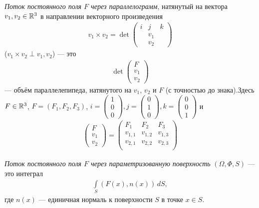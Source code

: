 \begin{df}
	\textit{Поток постоянного поля $F$ через параллелограмм}, натянутый на вектора $v_1, v_2 \in \mathbb{R}^{3}$ в направлении векторного произведения
 \begin{align*}
  v_1 \times v_2 = \det \begin{pmatrix}
   i & j & k \\
    & v_1 &  \\
    & v_2 &  
  \end{pmatrix}
 \end{align*} ($v_1 \times v_2 \perp v_1, v_2$) --- это
 \begin{align*}
  \det \begin{pmatrix}
   F \\
   v_1 \\
    v_2
  \end{pmatrix}
 \end{align*} --- объём параллелепипеда, натянутого на $v_1$, $v_2$ и $F$ (с точностью до знака).Здесь $F \in \mathbb{R}^{3}$, $F = (F_1, F_2, F_3)$, $i = \begin{pmatrix}
  1 \\ 0 \\ 0
 \end{pmatrix}, j = \begin{pmatrix}
  0 \\ 1 \\ 0
 \end{pmatrix}, k = \begin{pmatrix}
  0 \\ 0 \\ 1
 \end{pmatrix}$ и
 \begin{align*}
  \begin{pmatrix}
   F \\ v_1 \\ v_2
  \end{pmatrix} = \begin{pmatrix}
  F_1 & F_2 & F_3 \\
  v_{1,1} & v_{1,2} & v_{1,3} \\
  v_{2,1} & v_{2,2} & v_{2,3} \\
  \end{pmatrix}
 \end{align*} 
\end{df}
\begin{df}
	\textit{Поток постоянного поля $F$ через параметризованную поверхность} $(\Omega, \Phi, S)$ --- это интеграл
 \begin{align*}
  \int\limits_{S} (F(x), n(x)) \, dS
 ,\end{align*}  где $n(x)$ --- единичная нормаль к поверхности $S$ в точке $x \in S$.
\end{df}
